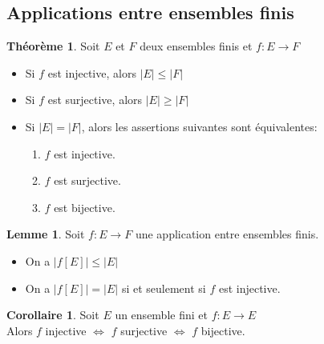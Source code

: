 \documentclass[10pt,a4paper]{article}
\theoremstyle{definition}
\newtheorem{theorem}[proposition]{Théorème}
\newtheorem{corollaire}[proposition]{Corollaire}
\newtheorem{lemme}[proposition]{Lemme}
\begin{document}
\subsection{Applications entre ensembles finis}
\begin{theorem}
Soit $E$ et $F$ deux ensembles finis et $f: E \to F$
\begin{itemize}
\item Si $f$ est injective, alors $|E| \leq |F|$
\item Si $f$ est surjective, alors $|E| \geq |F|$
\item Si $|E| = |F|$, alors les assertions suivantes sont équivalentes:
\begin{enumerate}
\item $f$ est injective.
\item $f$ est surjective.
\item $f$ est bijective.
\end{enumerate}
\end{itemize}
\end{theorem}
\begin{lemme}
Soit $f: E \to F$ une application entre ensembles finis.
\begin{itemize}
\item On a $\left|f[E]\right| \leq |E|$
\item On a $\left|f[E]\right| = |E|$ si et seulement si $f$ est injective.
\end{itemize}
\end{lemme}
\begin{corollaire}
Soit $E$ un ensemble fini et $f: E \to E$ \\
Alors $f$ injective $\iff$ $f$ surjective $\iff$ $f$ bijective.
\end{corollaire}
\end{document}
